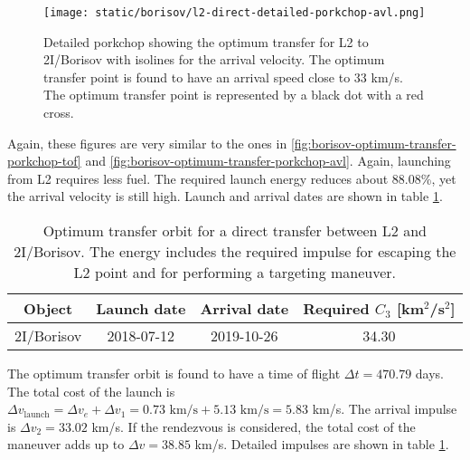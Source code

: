 \begin{figure}[H]
  \centering
  \texttt{[image: static/borisov/l2-direct-detailed-porkchop-avl.png]}
  \caption[Detailed porkchop showing the optimum transfer for
    L2 to 2I/Borisov with the arrival velocity.]{Detailed porkchop showing the
    optimum transfer for L2 to 2I/Borisov with isolines for the arrival
    velocity. The optimum transfer point is found to have an arrival speed
    close to 33 km/s. The optimum transfer point is represented by a black dot
    with a red cross.
  }
  \label{fig:l2-borisov-optimum-porkchop-avl}
\end{figure}

Again, these figures are very similar to the ones in
\ref{fig:borisov-optimum-transfer-porkchop-tof} and
\ref{fig:borisov-optimum-transfer-porkchop-avl}. Again, launching from L2
requires less fuel. The required launch energy reduces about 88.08\%, yet the
arrival velocity is still high. Launch and arrival dates are shown in table
\ref{tab:l2-borisov-direct-transfer-optimum}.

\vspace{1cm}
\begin{table}[H]
  \centering
  \begin{tabular}{|c|c|c|c|}
    \hline
    Object     & Launch date & Arrival date & Required $C_3$ [km$^2$/s$^2$] \\
    \hline
    2I/Borisov & 2018-07-12  & 2019-10-26   & 34.30                         \\
    \hline
  \end{tabular}
  \caption[Optimum transfer orbit for a direct transfer between L2 and
    2I/Borisov.]{Optimum transfer orbit for a direct transfer between
    L2 and 2I/Borisov. The energy includes the required impulse for
    escaping the L2 point and for performing a targeting maneuver.}
  \label{tab:l2-borisov-direct-transfer-optimum}
\end{table}

The optimum transfer orbit is found to have a time of flight $\Delta t = 470.79$
days. The total cost of the launch is $\Delta v_\text{launch} = \Delta v_e +
  \Delta v_1 = 0.73 \text{ km/s} + 5.13 \text{ km/s} = 5.83$ km/s. The arrival
impulse is $\Delta v_2 = 33.02$ km/s. If the rendezvous is considered, the total
cost of the maneuver adds up to $\Delta v = 38.85$ km/s. Detailed impulses are
shown in table \ref{tab:l2-borisov-direct-transfer-optimum}.


